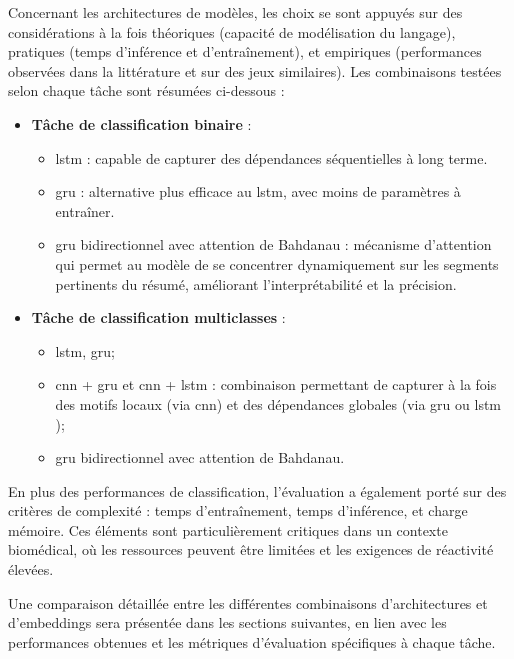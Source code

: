 \documentclass[12pt]{report}
\begin{document}
Concernant les architectures de modèles, les choix se sont appuyés sur des considérations à la fois théoriques (capacité de modélisation du langage), pratiques (temps d’inférence et d'entraînement), et empiriques (performances observées dans la littérature et sur des jeux similaires). Les combinaisons testées selon chaque tâche sont résumées ci-dessous :

\begin{itemize}
    \item \textbf{Tâche de classification binaire} :
    \begin{itemize}
        \item \gls{lstm} : capable de capturer des dépendances séquentielles à long terme.
        \item \gls{gru} : alternative plus efficace au \gls{lstm}, avec moins de paramètres à entraîner.
        \item \gls{gru} bidirectionnel avec attention de Bahdanau : mécanisme d’attention qui permet au modèle de se concentrer dynamiquement sur les segments pertinents du résumé, améliorant l’interprétabilité et la précision.
    \end{itemize}
    
    \item \textbf{Tâche de classification multiclasses} :
    \begin{itemize}
        \item \gls{lstm}, \gls{gru};
        \item \gls{cnn} + \gls{gru} et \gls{cnn} + \gls{lstm} : combinaison permettant de capturer à la fois des motifs locaux (via \gls{cnn}) et des dépendances globales (via \gls{gru} ou \gls{lstm} );
        \item \gls{gru} bidirectionnel avec attention de Bahdanau.
    \end{itemize}
\end{itemize}

En plus des performances de classification, l’évaluation a également porté sur des critères de complexité : temps d'entraînement, temps d'inférence, et charge mémoire. Ces éléments sont particulièrement critiques dans un contexte biomédical, où les ressources peuvent être limitées et les exigences de réactivité élevées.

Une comparaison détaillée entre les différentes combinaisons d’architectures et d’embeddings sera présentée dans les sections suivantes, en lien avec les performances obtenues et les métriques d’évaluation spécifiques à chaque tâche.
\end{document}
